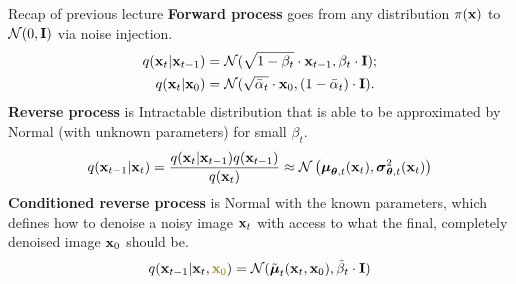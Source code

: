 

\usepackage{tikz}

\usetikzlibrary{arrows,shapes,positioning,shadows,trees}

\begin{frame}
\titlepage
\end{frame}
\begin{frame}{Recap of previous lecture}
	\textbf{Forward process} goes from any distribution $\pi(\mathbf{x})$ to $\mathcal{N}(0, \mathbf{I})$ via noise injection.
	\begin{align*}
		q(\mathbf{x}_t | \mathbf{x}_{t-1}) &= \mathcal{N}(\sqrt{1 - \beta_t} \cdot \mathbf{x}_{t-1}, \beta_t \cdot \mathbf{I}); \\
		q(\mathbf{x}_t | \mathbf{x}_0) &= \mathcal{N}(\sqrt{\bar{\alpha}_t} \cdot \mathbf{x}_0, (1 - \bar{\alpha}_t) \cdot \mathbf{I}).
	\end{align*}
	\textbf{Reverse process} is Intractable distribution that is able to be approximated by Normal (with unknown parameters) for small $\beta_t$.
	\[
		q(\mathbf{x}_{t-1}|\mathbf{x}_{t}) = \frac{q(\mathbf{x}_{t}|\mathbf{x}_{t-1}) q(\mathbf{x}_{t-1})}{q(\mathbf{x}_{t})} \approx \mathcal{N} \left(\boldsymbol{\mu}_{\boldsymbol{\theta}, t}(\mathbf{x}_t), \boldsymbol{\sigma}_{\boldsymbol{\theta}, t}^2(\mathbf{x}_t)\right)
	\]
	\textbf{Conditioned reverse process} is Normal with the known parameters, which defines how to denoise a noisy image $\mathbf{x}_t$ with access to what the final, completely denoised image $\mathbf{x}_0$ should be.
	\[
		q(\bx_{t-1}|\bx_{t}, {\color{olive}\bx_0}) = \cN(\tilde{\bmu}_t(\bx_t, \bx_0), \tilde{\beta}_t \cdot \bI)
	\]
\end{frame}

